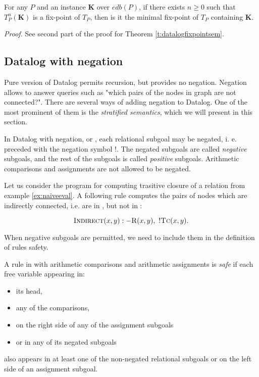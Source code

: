 \begin{thm}
For any $P$ and an instance $\textbf{K}$ over $edb(P)$, if there exists $n \ge 0$ such that $T_P^n(\textbf{K})$ is a fix-point of $T_P$, then is it the minimal fix-point of $T_P$ containing $\textbf{K}$.
\end{thm}
\emph{Proof.} See second part of the proof for Theorem \ref{t:datalogfixpointsem}.

\subsection{Datalog with negation}
Pure version of Datalog permits recursion, but provides no negation. Negation allows to answer queries such as "which pairs of the nodes in graph are not connected?". There are several ways of adding negation to Datalog. One of the most prominent of them is the \emph{stratified semantics}, which we will present in this section. 

In Datalog with negation, or \datalogneg, each relational subgoal may be negated, i. e. preceded with the negation symbol $!$. The negated subgoals are called \emph{negative} subgoals, and the rest of the subgoals is called \emph{positive} subgoals. Arithmetic comparisons and assignments are not allowed to be negated.

\begin{exmp}
Let us consider the program for computing trasitive closure  of a relation  from example \ref{ex:naiveeval}. A following rule computes the pairs of nodes which are indirectly connected, i.e. are in , but not in :

$$\textsc{Indirect}(x, y) :- \textsc{R}(x, y),~!\textsc{Tc}(x, y).$$
\end{exmp}

When negative subgoals are permitted, we need to include them in the definition of rules safety. 

\begin{defn}
A rule in \datalogneg with arithmetic comparisons and arithmetic assignments is \emph{safe} if each free variable appearing in:
\begin{itemize}
\item its head,
\item any of the comparisons,
\item on the right side of any of the assignment subgoals
\item or in any of its negated subgoals
\end{itemize}
also appears in at least one of the non-negated relational subgoals or on the left side of an assignment subgoal.
\end{defn}\label{d:datalogeqsaferule}

